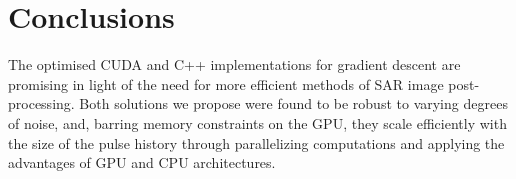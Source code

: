 \section{Conclusions}\label{sec:conclusions}

The optimised CUDA and C++ implementations for gradient descent are promising
in light of the need for more efficient methods of SAR image post-processing.
Both solutions we propose were found to be robust to varying degrees of noise,
and, barring memory constraints on the GPU, they scale efficiently with the
size of the pulse history through parallelizing computations and applying the
advantages of GPU and CPU architectures.
